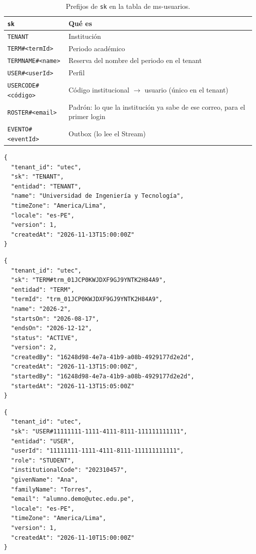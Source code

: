 \begin{table}[htbp]
\centering\small
\begin{tabularx}{\textwidth}{>{\raggedright\arraybackslash}p{}X}
\toprule
\texttt{sk} & Qué es \\
\midrule
\texttt{TENANT} & Institución \\
\texttt{TERM\#<termId>} & Periodo académico \\
\texttt{TERMNAME\#<name>} & Reserva del nombre del periodo en el tenant \\
\texttt{USER\#<userId>} & Perfil \\
\texttt{USERCODE\#<código>} & Código institucional $\rightarrow$ usuario (único en el tenant) \\
\texttt{ROSTER\#<email>} & Padrón: lo que la institución ya sabe de ese correo, para el primer login \\
\texttt{EVENTO\#<eventId>} & Outbox (lo lee el Stream) \\
\bottomrule
\end{tabularx}
\caption{Prefijos de \texttt{sk} en la tabla de ms-usuarios.}
\end{table}

\begin{lstlisting}
{
  "tenant_id": "utec",
  "sk": "TENANT",
  "entidad": "TENANT",
  "name": "Universidad de Ingeniería y Tecnología",
  "timeZone": "America/Lima",
  "locale": "es-PE",
  "version": 1,
  "createdAt": "2026-11-13T15:00:00Z"
}
\end{lstlisting}

\begin{lstlisting}
{
  "tenant_id": "utec",
  "sk": "TERM#trm_01JCP0KWJDXF9GJ9YNTK2H84A9",
  "entidad": "TERM",
  "termId": "trm_01JCP0KWJDXF9GJ9YNTK2H84A9",
  "name": "2026-2",
  "startsOn": "2026-08-17",
  "endsOn": "2026-12-12",
  "status": "ACTIVE",
  "version": 2,
  "createdBy": "16248d98-4e7a-41b9-a08b-4929177d2e2d",
  "createdAt": "2026-11-13T15:00:00Z",
  "startedBy": "16248d98-4e7a-41b9-a08b-4929177d2e2d",
  "startedAt": "2026-11-13T15:05:00Z"
}
\end{lstlisting}

\begin{lstlisting}
{
  "tenant_id": "utec",
  "sk": "USER#11111111-1111-4111-8111-111111111111",
  "entidad": "USER",
  "userId": "11111111-1111-4111-8111-111111111111",
  "role": "STUDENT",
  "institutionalCode": "202310457",
  "givenName": "Ana",
  "familyName": "Torres",
  "email": "alumno.demo@utec.edu.pe",
  "locale": "es-PE",
  "timeZone": "America/Lima",
  "version": 1,
  "createdAt": "2026-11-10T15:00:00Z"
}
\end{lstlisting}


